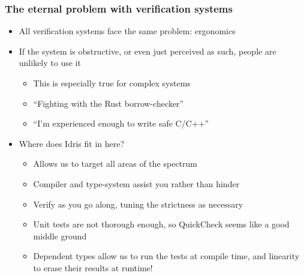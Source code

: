 \documentclass[compress,handout]{beamer}
\begin{document}
\begin{frame}
  \frametitle{The eternal problem with verification systems}

  \begin{itemize}
    \item<1-> All verification systems face the same problem: ergonomics
    \item<2-> If the system is obstructive, or even just perceived as such,
              people are unlikely to use it
    \begin{itemize}
      \item<3-> This is especially true for complex systems
      \item<3-> ``Fighting with the Rust borrow-checker''
      \item<3-> ``I'm experienced enough to write safe C/C++''
    \end{itemize}
    \item<4-> Where does Idris fit in here?
      \begin{itemize}
        \item<5-> Allows us to target all areas of the spectrum
        \item<6-> Compiler and type-system assist you rather than hinder
        \item<7-> Verify as you go along, tuning the strictness as necessary
        \item<8-> Unit tests are not thorough enough, so QuickCheck seems like a
                  good middle ground
        \item<9-> Dependent types allow us to run the tests at compile time, and
                  linearity to erase their results at runtime!
      \end{itemize}
  \end{itemize}

  \vspace*{-5mm}

\end{frame}
\end{document}
